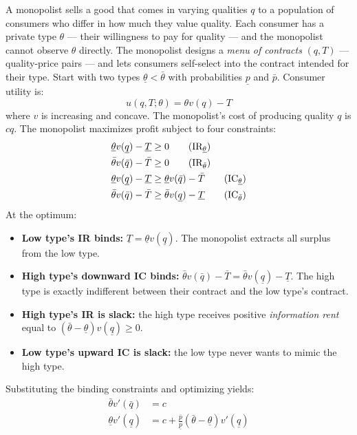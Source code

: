 \documentclass[11pt,english]{article}
\begin{document}
A monopolist sells a good that comes in varying qualities $q$ to a population of consumers who differ in how much they value quality. Each consumer has a private type $\theta$ --- their willingness to pay for quality --- and the monopolist cannot observe $\theta$ directly. The monopolist designs a \textit{menu of contracts} $(q, T)$ --- quality-price pairs --- and lets consumers self-select into the contract intended for their type. Start with two types $\underline{\theta} < \bar{\theta}$ with probabilities $\underline{p}$ and $\bar{p}$. Consumer utility is:
\begin{equation}
    u(q, T; \theta) = \theta v(q) - T
\end{equation}
where $v$ is increasing and concave. The monopolist's cost of producing quality $q$ is $cq$. The monopolist maximizes profit subject to four constraints:
\begin{align}
    \underline{\theta} v(\underline{q}) - \underline{T} &\geq 0 \tag{IR$_{\underline{\theta}}$} \\
    \bar{\theta} v(\bar{q}) - \bar{T} &\geq 0 \tag{IR$_{\bar{\theta}}$} \\
    \underline{\theta} v(\underline{q}) - \underline{T} &\geq \underline{\theta} v(\bar{q}) - \bar{T} \tag{IC$_{\underline{\theta}}$} \\
    \bar{\theta} v(\bar{q}) - \bar{T} &\geq \bar{\theta} v(\underline{q}) - \underline{T} \tag{IC$_{\bar{\theta}}$}
\end{align}
At the optimum:
\begin{itemize}
    \item \textbf{Low type's IR binds:} $\underline{T} = \underline{\theta} v(\underline{q})$. The monopolist extracts all surplus from the low type.
    \item \textbf{High type's downward IC binds:} $\bar{\theta} v(\bar{q}) - \bar{T} = \bar{\theta} v(\underline{q}) - \underline{T}$. The high type is exactly indifferent between their contract and the low type's contract.
    \item \textbf{High type's IR is slack:} the high type receives positive \textit{information rent} equal to $(\bar{\theta} - \underline{\theta})v(\underline{q}) \geq 0$.
    \item \textbf{Low type's upward IC is slack:} the low type never wants to mimic the high type.
\end{itemize}
Substituting the binding constraints and optimizing yields:
\begin{align}
    \bar{\theta} v'(\bar{q}) &= c \tag{no distortion at top} \\
    \underline{\theta} v'(\underline{q}) &= c + \frac{\bar{p}}{\underline{p}}(\bar{\theta} - \underline{\theta}) v'(\underline{q}) \tag{downward distortion at bottom}
\end{align}
\end{document}
